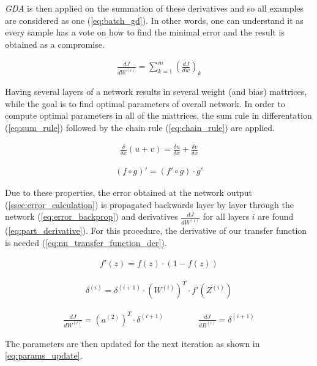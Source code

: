 \textit{GDA} is then applied on the summation of these derivatives and so all examples are considered as one (\cref{eq:batch_gd}). In other words, one can understand it as every sample has a vote on how to find the minimal error and the result is obtained as a compromise.

\begin{align} \label{eq:batch_gd}
\frac{dJ}{dW^{(i)}} =  \displaystyle{\sum_{k=1}^m} (\frac{dJ}{dw})_k
\end{align}

Having several layers of a network results in several weight (and bias) mattrices, while the goal is to find optimal parameters of overall network. In order to compute optimal parameters in all of the mattrices, the sum rule in differentation (\cref{eq:sum_rule}) followed by the chain rule (\cref{eq:chain_rule}) are applied.

\begin{align} \label{eq:sum_rule}
\frac{\delta}{\delta x} (u+v) = \frac{\delta u}{\delta x} + \frac{\delta v}{\delta x}
\end{align}

\begin{align} \label{eq:chain_rule}
(f \circ g)' = (f' \circ g) \cdot g'
\end{align}

Due to these properties, the error obtained at the network output (\cref{ssec:error_calculation}) is propagated backwards layer by layer through the network (\cref{eq:error_backprop}) and derivatives $ \frac{dJ}{dW^{(i)}} $ for all layers $ i $ are found (\cref{eq:part_derivative}). For this procedure, the derivative of our transfer function is needed (\cref{eq:nn_transfer_function_der}).

\begin{align} \label{eq:nn_transfer_function_der}
f'(z) = f(z) \cdot (1-f(z))
\end{align}

\begin{align} \label{eq:error_backprop}
\delta^{(i)} = \delta^{(i+1)} \cdot (W^{(i)})^T \cdot f'(Z^{(i)})
\end{align}

\begin{align} \label{eq:part_derivative}
\frac{dJ}{dW^{(i)}} = (a^{(2)})^T \cdot \delta^{(i+1)} \qquad\qquad \frac{dJ}{dB^{(i)}} = \delta^{(i+1)}
\end{align}

The parameters are then updated for the next iteration as shown in \cref{eq:params_update}.

